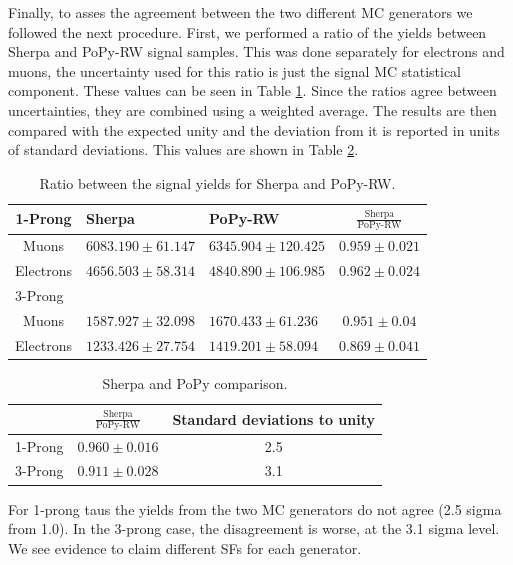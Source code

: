 Finally, to asses the agreement between the two different MC generators we followed the next procedure. First, we performed a ratio of the yields between Sherpa and PoPy-RW signal samples. This was done separately for electrons and muons, the uncertainty used for this ratio is just the signal MC statistical component. These values can be seen in Table \ref{Tab10}. Since the ratios agree between uncertainties, they are combined using a weighted average. The results are then compared with the expected unity and the deviation from it is reported in units of standard deviations. This values are shown in Table \ref{Tab11}.
\begin{table}[]
	\centering
	\begin{tabular}{|c|llc|}
		\hline
		1-Prong                       & \multicolumn{1}{l|}{Sherpa}                & \multicolumn{1}{l|}{PoPy-RW}                & $\frac{\text{Sherpa}}{\text{PoPy-RW}}$ \\ \hline
		Muons                         & \multicolumn{1}{l|}{$6083.190 \pm 61.147$} & \multicolumn{1}{l|}{$6345.904 \pm 120.425$} & $0.959 \pm 0.021$                             \\ \hline
		Electrons                     & \multicolumn{1}{l|}{$4656.503 \pm 58.314$} & \multicolumn{1}{l|}{$4840.890 \pm 106.985$} & $0.962 \pm 0.024$                             \\ \hline
		\multicolumn{1}{|l|}{3-Prong} & \multicolumn{3}{l|}{}                                                                                                                    \\ \hline
		Muons                         & \multicolumn{1}{l|}{$1587.927 \pm 32.098$} & \multicolumn{1}{l|}{$1670.433 \pm 61.236$}  & $0.951 \pm 0.04$                              \\ \hline
		Electrons                     & \multicolumn{1}{l|}{$1233.426 \pm 27.754$} & \multicolumn{1}{l|}{$1419.201 \pm 58.094$}  & $0.869 \pm 0.041$                             \\ \hline
	\end{tabular}
	\caption{Ratio between the signal yields for Sherpa and PoPy-RW.}
	\label{Tab10}
\end{table}

\begin{table}[]
	\centering
	\begin{tabular}{|c|c|c|}
		\hline
		& $\frac{\text{Sherpa}}{\text{PoPy-RW}}$ & Standard deviations to unity  \\ \hline
		1-Prong & $0.960 \pm 0.016$                                        & 2.5       \\ \hline
		3-Prong & $0.911  \pm 0.028$                                       & 3.1       \\ \hline
	\end{tabular}
	\caption{Sherpa and PoPy comparison.}
	\label{Tab11}
\end{table}		  
For 1-prong taus the yields from the two MC generators do not agree (2.5 sigma from 1.0). In the 3-prong case, the disagreement is worse, at the 3.1 sigma level. We see evidence to claim different SFs for each generator.

